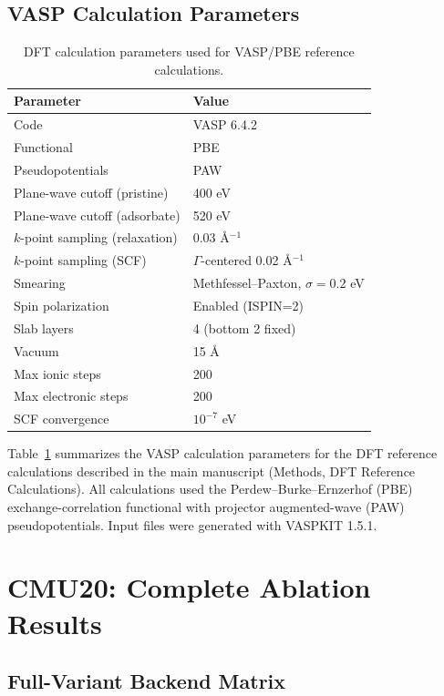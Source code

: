 \documentclass[%
 preprint,
 superscriptaddress,
 amsmath,amssymb,
 aps,
 prb,
 floatfix,
]{revtex4-2}
\begin{document}
\subsection{VASP Calculation Parameters}

\begin{table}[ht]
\centering
\caption{DFT calculation parameters used for VASP/PBE reference calculations.}
\label{tab:si-dft-params}
\begin{tabular}{ll}
\toprule
Parameter & Value \\
\midrule
Code & VASP 6.4.2 \\
Functional & PBE \\
Pseudopotentials & PAW \\
Plane-wave cutoff (pristine) & 400 eV \\
Plane-wave cutoff (adsorbate) & 520 eV \\
$k$-point sampling (relaxation) & 0.03 \AA$^{-1}$ \\
$k$-point sampling (SCF) & $\Gamma$-centered 0.02 \AA$^{-1}$ \\
Smearing & Methfessel--Paxton, $\sigma=0.2$ eV \\
Spin polarization & Enabled (ISPIN=2) \\
Slab layers & 4 (bottom 2 fixed) \\
Vacuum & 15 \AA \\
Max ionic steps & 200 \\
Max electronic steps & 200 \\
SCF convergence & $10^{-7}$ eV \\
\bottomrule
\end{tabular}
\end{table}

Table~\ref{tab:si-dft-params} summarizes the VASP calculation parameters for the DFT reference calculations described in the main manuscript (Methods, DFT Reference Calculations). All calculations used the Perdew--Burke--Ernzerhof (PBE) exchange-correlation functional with projector augmented-wave (PAW) pseudopotentials. Input files were generated with VASPKIT 1.5.1.

\section{CMU20: Complete Ablation Results}

\subsection{Full-Variant Backend Matrix}
\end{document}

